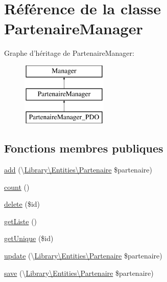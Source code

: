 \hypertarget{class_library_1_1_models_1_1_partenaire_manager}{\section{Référence de la classe Partenaire\+Manager}
\label{class_library_1_1_models_1_1_partenaire_manager}
}
Graphe d'héritage de Partenaire\+Manager\+:\begin{figure}[H]
\begin{center}
\leavevmode
\includegraphics[height=3.000000cm]{class_library_1_1_models_1_1_partenaire_manager}
\end{center}
\end{figure}
\subsection*{Fonctions membres publiques}
\begin{DoxyCompactItemize}
\item 
\hyperlink{class_library_1_1_models_1_1_partenaire_manager_a18c85c0998e15675f78832d5679b41b5}{add} (\textbackslash{}\hyperlink{class_library_1_1_entities_1_1_partenaire}{Library\textbackslash{}\+Entities\textbackslash{}\+Partenaire} \$partenaire)
\item 
\hyperlink{class_library_1_1_models_1_1_partenaire_manager_ac751e87b3d4c4bf2feb03bee8b092755}{count} ()
\item 
\hyperlink{class_library_1_1_models_1_1_partenaire_manager_a2f8258add505482d7f00ea26493a5723}{delete} (\$id)
\item 
\hyperlink{class_library_1_1_models_1_1_partenaire_manager_a20b3a2f576f3ea746f769779a329491e}{get\+Liste} ()
\item 
\hyperlink{class_library_1_1_models_1_1_partenaire_manager_ab94c8b937a2aa55fce0bb7f77f68c00e}{get\+Unique} (\$id)
\item 
\hyperlink{class_library_1_1_models_1_1_partenaire_manager_a1cb71d926c932683003f9b931c294845}{update} (\textbackslash{}\hyperlink{class_library_1_1_entities_1_1_partenaire}{Library\textbackslash{}\+Entities\textbackslash{}\+Partenaire} \$partenaire)
\item 
\hyperlink{class_library_1_1_models_1_1_partenaire_manager_a3ebf4842851e8b055998c1523c8d10f3}{save} (\textbackslash{}\hyperlink{class_library_1_1_entities_1_1_partenaire}{Library\textbackslash{}\+Entities\textbackslash{}\+Partenaire} \$partenaire)
\end{DoxyCompactItemize}
